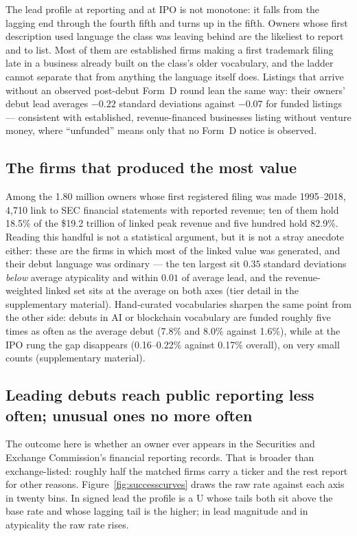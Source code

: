 The lead profile at reporting and at IPO is not monotone: it falls from
the lagging end through the fourth fifth and turns up in the fifth. Owners
whose first description used language the class was leaving behind are the
likeliest to report and to list. Most of them are established firms making
a first trademark filing late in a business already built on the class's
older vocabulary, and the ladder cannot separate that from anything the
language itself does. Listings that arrive without an observed post-debut
Form~D round lean the same way: their owners' debut lead averages $-0.22$
standard deviations against $-0.07$ for funded listings --- consistent
with established, revenue-financed businesses listing without venture
money, where ``unfunded'' means only that no Form~D notice is observed.

\subsection{The firms that produced the most value}\label{sec:value}

Among the 1.80 million owners whose first registered filing was made
1995--2018, 4{,}710 link to SEC financial statements with reported
revenue; ten of them hold 18.5\% of the \$19.2 trillion of linked peak
revenue and five hundred hold 82.9\%. Reading this handful is not a
statistical argument, but it is not a stray anecdote either: these are
the firms in which most of the linked value was generated, and their
debut language was ordinary --- the ten largest sit $0.35$ standard
deviations \emph{below} average atypicality and within $0.01$ of average
lead, and the revenue-weighted linked set sits at the average on both
axes (tier detail in the supplementary material). Hand-curated
vocabularies sharpen the same point from the other side: debuts in AI or
blockchain vocabulary are funded roughly five times as often as the
average debut (7.8\% and 8.0\% against 1.6\%), while at the IPO rung the
gap disappears (0.16--0.22\% against 0.17\% overall), on very small
counts (supplementary material).

\subsection{Leading debuts reach public reporting less often; unusual ones no more often}\label{sec:bluesea}

The outcome here is whether an owner ever appears in the Securities and
Exchange Commission's financial reporting records. That is broader than
exchange-listed: roughly half the matched firms carry a ticker and the
rest report for other reasons. Figure~\ref{fig:successcurves} draws the
raw rate against each axis in twenty bins. In signed lead the profile is a
U whose tails both sit above the base rate and whose lagging tail is the
higher; in lead magnitude and in atypicality the raw rate rises.

